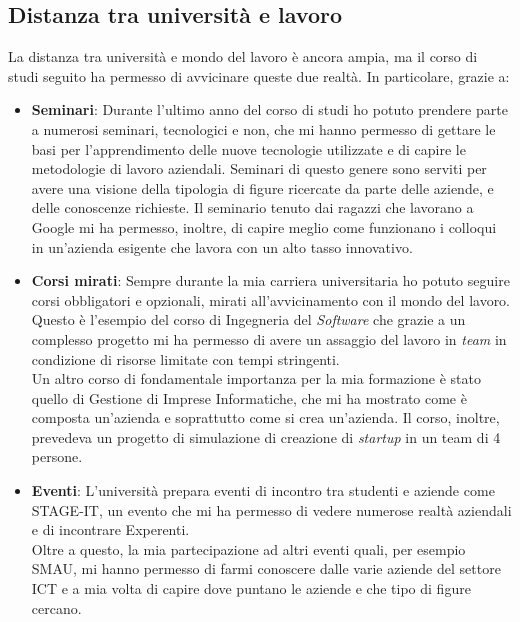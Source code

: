 \subsection{Distanza tra universit\`a e lavoro}
La distanza tra universit\`a e mondo del lavoro \`e ancora ampia, ma il corso di studi seguito ha permesso di avvicinare queste due realt\`a. In particolare, grazie a:

\begin{itemize}
	\item \textbf{Seminari}: Durante l'ultimo anno del corso di studi ho potuto prendere parte a numerosi seminari, tecnologici e non, che mi hanno permesso di gettare le basi per l'apprendimento delle nuove tecnologie utilizzate e di capire le metodologie di lavoro aziendali. Seminari di questo genere sono serviti per avere una visione della tipologia di figure ricercate da parte delle aziende, e delle conoscenze richieste. Il seminario tenuto dai ragazzi che lavorano a Google mi ha permesso, inoltre, di capire meglio come funzionano i colloqui in un'azienda esigente che lavora con un alto tasso innovativo.
	
	\item \textbf{Corsi mirati}: Sempre durante la mia carriera universitaria ho potuto seguire corsi obbligatori e opzionali, mirati all'avvicinamento con il mondo del lavoro. Questo \`e l'esempio del corso di Ingegneria del \textit{Software} che grazie a un complesso progetto mi ha permesso di avere un assaggio del lavoro in \textit{team} in condizione di risorse limitate con tempi stringenti.\\
	Un altro corso di fondamentale importanza per la mia formazione \`e stato quello di Gestione di Imprese Informatiche, che mi ha mostrato come \`e composta un'azienda e soprattutto come si crea un'azienda. Il corso, inoltre, prevedeva un progetto di simulazione di creazione di \textit{startup} in un team di 4 persone.
	
	\item \textbf{Eventi}: L'universit\`a prepara eventi di incontro tra studenti e aziende come STAGE-IT, un evento che mi ha permesso di vedere numerose realt\`a aziendali e di incontrare Experenti.\\
	Oltre a questo, la mia partecipazione ad altri eventi quali, per esempio SMAU, mi hanno permesso di farmi conoscere dalle varie aziende del settore ICT e a mia volta di capire dove puntano le aziende e che tipo di figure cercano.\\
\end{itemize}


